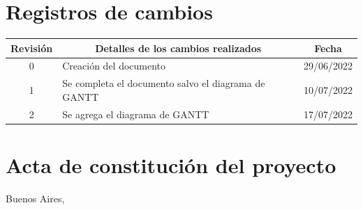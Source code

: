 \documentclass[
11pt, %
]{charter}
\begin{document}
\maketitle
\thispagestyle{empty}
\pagebreak


\thispagestyle{empty}
{\setlength{\parskip}{0pt}
\tableofcontents{}
}
\pagebreak


\section*{Registros de cambios}
\label{sec:registro}


\begin{table}[ht]
\label{tab:registro}
\centering
\begin{tabularx}{\linewidth}{@{}|c|X|c|@{}}
\hline
\rowcolor[HTML]{C0C0C0} 
Revisión & \multicolumn{1}{c|}{\cellcolor[HTML]{C0C0C0}Detalles de los cambios realizados} & Fecha \\ \hline
0        & Creación del documento                                 & 29/06/2022 \\ \hline
1        & Se completa el documento salvo el diagrama de GANTT    & 10/07/2022 \\ \hline
2        & Se agrega el diagrama de GANTT                         & 17/07/2022 \\ \hline
\end{tabularx}
\end{table}

\pagebreak



\section*{Acta de constitución del proyecto}
\label{sec:acta}

\begin{flushright}
Buenos Aires, \fechaInicioName
\end{flushright}

\vspace{2cm}
\end{document}
